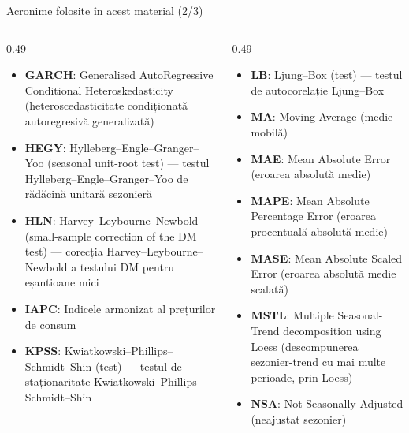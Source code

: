 \begin{frame}{Acronime folosite în acest material (2/3)}
\begin{columns}[T]
\begin{column}{0.49\textwidth}
\begin{itemize}\setlength{\itemsep}{0pt}
    \item \textbf{GARCH}: Generalised AutoRegressive Conditional Heteroskedasticity (heteroscedasticitate condiționată autoregresivă generalizată)
    \item \textbf{HEGY}: Hylleberg–Engle–Granger–Yoo (seasonal unit-root test) — testul Hylleberg–Engle–Granger–Yoo de rădăcină unitară sezonieră
    \item \textbf{HLN}: Harvey–Leybourne–Newbold (small-sample correction of the DM test) — corecția Harvey–Leybourne–Newbold a testului DM pentru eșantioane mici
    \item \textbf{IAPC}: Indicele armonizat al prețurilor de consum
    \item \textbf{KPSS}: Kwiatkowski–Phillips–Schmidt–Shin (test) — testul de staționaritate Kwiatkowski–Phillips–Schmidt–Shin
\end{itemize}
\end{column}
\begin{column}{0.49\textwidth}
\begin{itemize}\setlength{\itemsep}{0pt}
    \item \textbf{LB}: Ljung–Box (test) — testul de autocorelație Ljung–Box
    \item \textbf{MA}: Moving Average (medie mobilă)
    \item \textbf{MAE}: Mean Absolute Error (eroarea absolută medie)
    \item \textbf{MAPE}: Mean Absolute Percentage Error (eroarea procentuală absolută medie)
    \item \textbf{MASE}: Mean Absolute Scaled Error (eroarea absolută medie scalată)
    \item \textbf{MSTL}: Multiple Seasonal-Trend decomposition using Loess (descompunerea sezonier-trend cu mai multe perioade, prin Loess)
    \item \textbf{NSA}: Not Seasonally Adjusted (neajustat sezonier)
\end{itemize}
\end{column}
\end{columns}
\end{frame}
